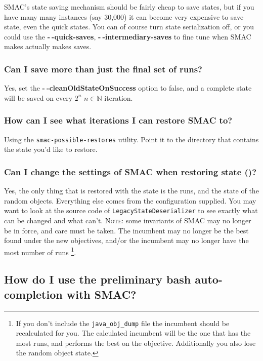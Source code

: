 \documentclass[11pt,letterpaper,oneside]{article}
\begin{document}
	SMAC's state saving mechanism should be fairly cheap to save states, but if you have many many instances (say 30,000) it can become very expensive to save state, even the quick states. You can of course turn state serialization off, or you could use the \textbf{-$~\!$-quick-saves}, \textbf{-$~\!$-intermediary-saves} to fine tune when SMAC makes actually makes saves.
          			
	
	
\subsubsection{Can I save more than just the final set of runs?}

	Yes, set the \textbf{-$~\!$-cleanOldStateOnSuccess} option to false, and a complete state will be saved on every $2^n$  $n\in\mathbb{N}$ iteration.

\subsubsection{How can I see what iterations I can restore SMAC to?}

	Using the \texttt{smac-possible-restores} utility. Point it to the directory that contains the state you'd like to restore.

\subsubsection{Can I change the settings of SMAC when restoring state ()?}

	Yes, the only thing that is restored with the state is the runs, and the state of the random objects. Everything else comes from the configuration supplied. You may want to look at the source code of \texttt{LegacyStateDeserializer} to see exactly what can be changed and what can't. \textsc{Note:} some invariants of SMAC may no longer be in force, and care must be taken. The incumbent may no longer be the best found under the new objectives, and/or the incumbent may no longer have the most number of runs \footnote{If you don't include the \texttt{java\_obj\_dump} file the incumbent should be recalculated for you. The calculated incumbent will be the one that has the most runs, and performs the best on the objective. Additionally you also lose the random object state.}. 
	

\subsection{How do I use the preliminary bash auto-completion with SMAC?}
\end{document}
